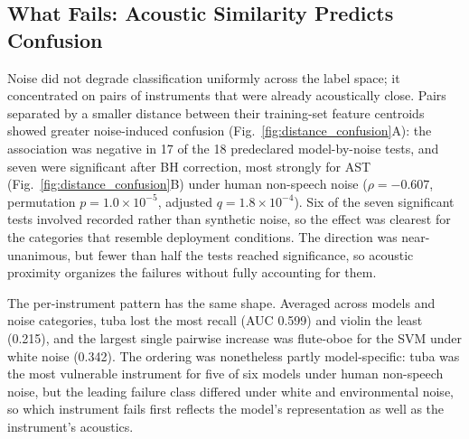 \documentclass[conference]{IEEEtran}
\begin{document}
\subsection{What Fails: Acoustic Similarity Predicts Confusion}
Noise did not degrade classification uniformly across the label space; it concentrated on pairs of instruments that were already acoustically close. Pairs separated by a smaller distance between their training-set feature centroids showed greater noise-induced confusion (Fig.~\ref{fig:distance_confusion}A): the association was negative in 17 of the 18 predeclared model-by-noise tests, and seven were significant after BH correction, most strongly for AST (Fig.~\ref{fig:distance_confusion}B) under human
non-speech noise ($\rho = -0.607$, permutation $p = 1.0 \times 10^{-5}$, adjusted $q = 1.8 \times 10^{-4}$). Six of the seven significant tests involved recorded rather than synthetic noise, so the effect was clearest for the categories that resemble deployment conditions. The direction was near-unanimous, but fewer than half the tests reached significance, so acoustic proximity organizes the failures without fully accounting for them.

The per-instrument pattern has the same shape. Averaged across models and noise categories, tuba lost the most recall (AUC 0.599) and violin the least (0.215), and the largest single pairwise increase was flute-oboe for the SVM under white noise (0.342). The ordering was nonetheless partly model-specific: tuba was the most vulnerable instrument for five of six models under human non-speech noise, but the leading failure class differed under white and environmental noise, so which instrument fails first reflects the model's representation as well as the instrument's acoustics.
\end{document}
